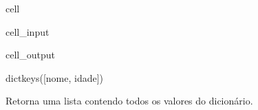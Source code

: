 \documentclass[letterpaper,10pt,english]{jupyterBook}
\begin{document}
\begin{sphinxuseclass}{cell}\begin{sphinxVerbatimInput}

\begin{sphinxuseclass}{cell_input}
\begin{sphinxVerbatim}[commandchars=\\\{\}]
     
  
\end{sphinxVerbatim}

\end{sphinxuseclass}\end{sphinxVerbatimInput}
\begin{sphinxVerbatimOutput}

\begin{sphinxuseclass}{cell_output}
\begin{sphinxVerbatim}[commandchars=\\\{\}]
dict\PYGZus{}keys([\PYGZsq{}nome\PYGZsq{}, \PYGZsq{}idade\PYGZsq{}])
\end{sphinxVerbatim}

\end{sphinxuseclass}\end{sphinxVerbatimOutput}

\end{sphinxuseclass}
\sphinxAtStartPar
{}
Retorna uma lista contendo todos os valores do dicionário.
\end{document}
